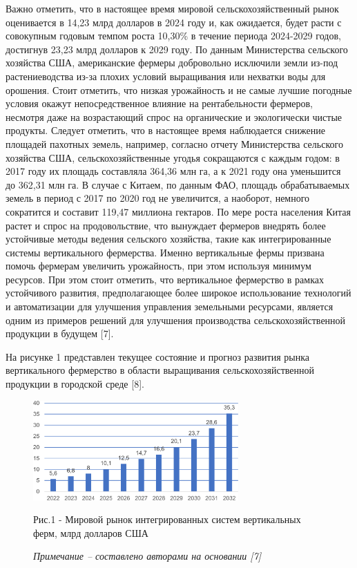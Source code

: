 \begin{multicols}{2}
Важно отметить, что в настоящее время мировой сельскохозяйственный рынок
оценивается в 14,23 млрд долларов в 2024 году и, как ожидается, будет
расти с совокупным годовым темпом роста 10,30\% в течение периода
2024-2029 годов, достигнув 23,23 млрд долларов к 2029 году. По данным
Министерства сельского хозяйства США, американские фермеры добровольно
исключили земли из-под растениеводства из-за плохих условий выращивания
или нехватки воды для орошения. Стоит отметить, что низкая урожайность и
не самые лучшие погодные условия окажут непосредственное влияние на
рентабельности фермеров, несмотря даже на возрастающий спрос на
органические и экологически чистые продукты. Следует отметить, что в
настоящее время наблюдается снижение площадей пахотных земель, например,
согласно отчету Министерства сельского хозяйства США,
сельскохозяйственные угодья сокращаются с каждым годом: в 2017 году их
площадь составляла 364,36 млн га, а к 2021 году она уменьшится до 362,31
млн га. В случае с Китаем, по данным ФАО, площадь обрабатываемых земель
в период с 2017 по 2020 год не увеличится, а наоборот, немного
сократится и составит 119,47 миллиона гектаров. По мере роста населения
Китая растет и спрос на продовольствие, что вынуждает фермеров внедрять
более устойчивые методы ведения сельского хозяйства, такие как
интегрированные системы вертикального фермерства. Именно вертикальные
фермы призвана помочь фермерам увеличить урожайность, при этом используя
минимум ресурсов. При этом стоит отметить, что вертикальное фермерство в
рамках устойчивого развития, предполагающее более широкое использование
технологий и автоматизации для улучшения управления земельными
ресурсами, является одним из примеров решений для улучшения производства
сельскохозяйственной продукции в будущем {[}7{]}.

На рисунке 1 представлен текущее состояние и прогноз развития рынка
вертикального фермерство в области выращивания сельскохозяйственной
продукции в городской среде {[}8{]}.
\end{multicols}

\begin{figure}[H]
	\centering
	\includegraphics[width=0.7\textwidth]{media/ekon4/image10}
	\caption*{Рис.1 - Мировой рынок интегрированных систем вертикальных ферм, млрд долларов США}
	\caption*{\normalfont\emph{Примечание -- составлено авторами на основании {[}7{]}}}
\end{figure}

